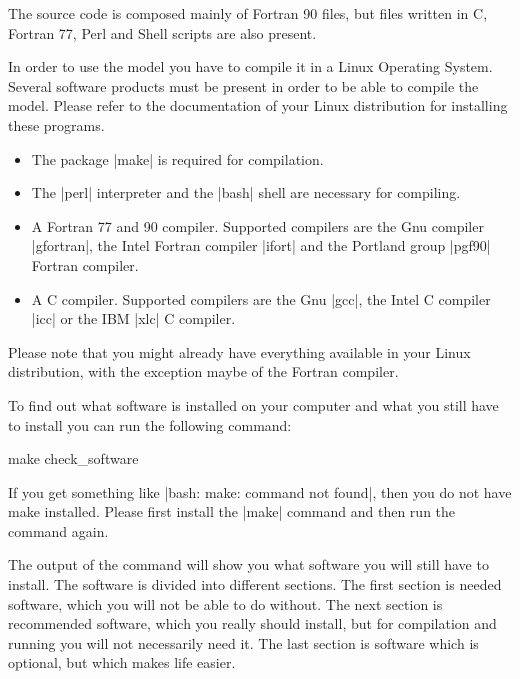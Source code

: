 
The source code is composed mainly of Fortran 90 files, but files written
in C, Fortran 77, Perl and Shell scripts are also present.

In order to use the model you have to compile it in a Linux Operating
System. Several software products must be present in order to be able
to compile the model. Please refer to the documentation of your Linux
distribution for installing these programs.

\begin{itemize}

\item The package |make| is required for compilation.

\item The |perl| interpreter and the |bash| shell are necessary for compiling.

\item A Fortran 77 and 90 compiler. Supported compilers are the Gnu 
compiler |gfortran|, the Intel Fortran compiler |ifort| and the Portland 
group |pgf90| Fortran compiler.

\item A C compiler. Supported compilers are the Gnu |gcc|, the Intel C
compiler |icc| or the IBM |xlc| C compiler.

\end{itemize}

Please note that you might already have everything available in your
Linux distribution, with the exception maybe of the Fortran compiler.

To find out what software is installed on your computer and what you
still have to install you can run the following command:

\begin{code}
    make check_software
\end{code}

If you get something like |bash: make: command not found|, then you do
not have make installed. Please first install the |make| command and
then run the command again.

The output of the command will show you what software you will still have
to install. The software is divided into different sections. The first
section is needed software, which you will not be able to do without. The
next section is recommended software, which you really should install,
but for compilation and running you will not necessarily need it. The
last section is software which is optional, but which makes life easier.

